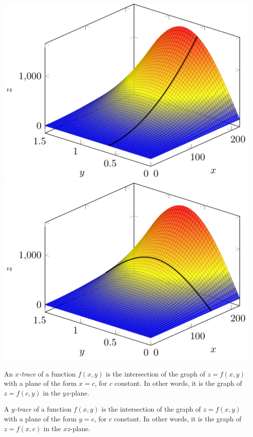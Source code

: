 \begin{example}
    \begin{center}
        \includegraphics[scale=1]{tikz-pictures/section-9.1-again-pic1-3d-graph-with-traces-2.pdf}
        \hfill
        \includegraphics[scale=1]{tikz-pictures/section-9.1-again-pic1-3d-graph-with-traces-3.pdf}\label{img:3d-graph-traces}
    \end{center}
\end{example}

\begin{defn}[Trace]
    An \emph{$x$-trace} of a function $f(x,y)$ is the intersection of the graph of $z=f(x,y)$ with a plane of the form $x=c$, for $c$ constant. In other words, it is the graph of $z=f(c,y)$ in the $yz$-plane.
    
    A \emph{$y$-trace} of a function $f(x,y)$ is the intersection of the graph of $z=f(x,y)$ with a plane of the form $y=c$, for $c$ constant. In other words, it is the graph of $z=f(x,c)$ in the $xz$-plane.
\end{defn}

